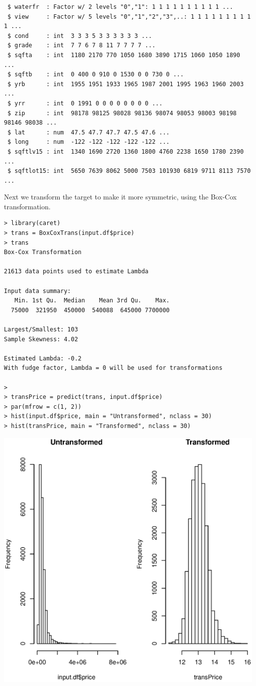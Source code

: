 \documentclass{article}%
\begin{document}
\begin{verbatim}
 $ waterfr  : Factor w/ 2 levels "0","1": 1 1 1 1 1 1 1 1 1 1 ...
 $ view     : Factor w/ 5 levels "0","1","2","3",..: 1 1 1 1 1 1 1 1 1 1 ...
 $ cond     : int  3 3 3 5 3 3 3 3 3 3 ...
 $ grade    : int  7 7 6 7 8 11 7 7 7 7 ...
 $ sqfta    : int  1180 2170 770 1050 1680 3890 1715 1060 1050 1890 ...
 $ sqftb    : int  0 400 0 910 0 1530 0 0 730 0 ...
 $ yrb      : int  1955 1951 1933 1965 1987 2001 1995 1963 1960 2003 ...
 $ yrr      : int  0 1991 0 0 0 0 0 0 0 0 ...
 $ zip      : int  98178 98125 98028 98136 98074 98053 98003 98198 98146 98038 ...
 $ lat      : num  47.5 47.7 47.7 47.5 47.6 ...
 $ long     : num  -122 -122 -122 -122 -122 ...
 $ sqftlv15 : int  1340 1690 2720 1360 1800 4760 2238 1650 1780 2390 ...
 $ sqftlot15: int  5650 7639 8062 5000 7503 101930 6819 9711 8113 7570 ...
\end{verbatim}
Next we transform the target to make it more symmetric, using the Box-Cox transformation.
\begin{verbatim}
> library(caret)
> trans = BoxCoxTrans(input.df$price)
> trans
Box-Cox Transformation

21613 data points used to estimate Lambda

Input data summary:
   Min. 1st Qu.  Median    Mean 3rd Qu.    Max.
  75000  321950  450000  540088  645000 7700000

Largest/Smallest: 103
Sample Skewness: 4.02

Estimated Lambda: -0.2
With fudge factor, Lambda = 0 will be used for transformations

>
> transPrice = predict(trans, input.df$price)
> par(mfrow = c(1, 2))
> hist(input.df$price, main = "Untransformed", nclass = 30)
> hist(transPrice, main = "Transformed", nclass = 30)
\end{verbatim}
\includegraphics[width=\textwidth]{Symmetric.eps}
\end{document}
